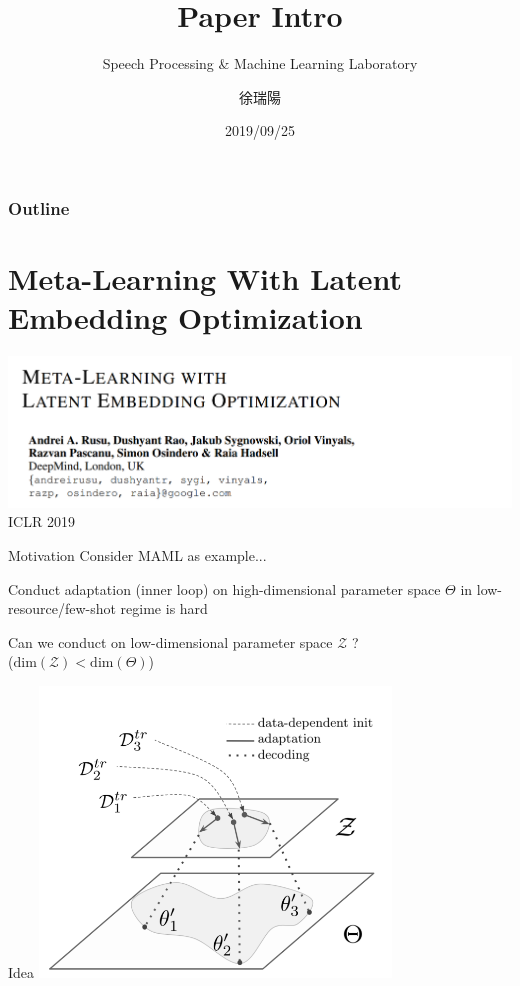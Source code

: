 \documentclass{beamer}
\title{Paper Intro}
\subtitle{\textcolor[rgb]{0.00,0.50,1.00}{{Speech Processing \& Machine Learning Laboratory}}}
\author{徐瑞陽}
\date{2019/09/25}
\begin{document}
\begin{frame}
\maketitle
\end{frame}



\begin{frame}
\frametitle{Outline}
\tableofcontents
\end{frame}

\section{Meta-Learning With Latent Embedding Optimization}
\begin{frame}
  \includegraphics[width=\textwidth]{fig/LEO.png}
  \center ICLR 2019
\end{frame}

\begin{frame}{Motivation}
  Consider MAML as example...

  Conduct adaptation (inner loop) on high-dimensional parameter space $\Theta$ in low-resource/few-shot regime is hard

  \pause

  \center Can we conduct on low-dimensional parameter space $\mathcal{Z}$ ? \\ 
  ($\text{dim}(\mathcal{Z}) < \text{dim}(\Theta)$)
\end{frame}

\begin{frame}{Idea}
  \center \includegraphics[width=0.7\textwidth]{fig/LEO-idea.png}
\end{frame}
\end{document}
